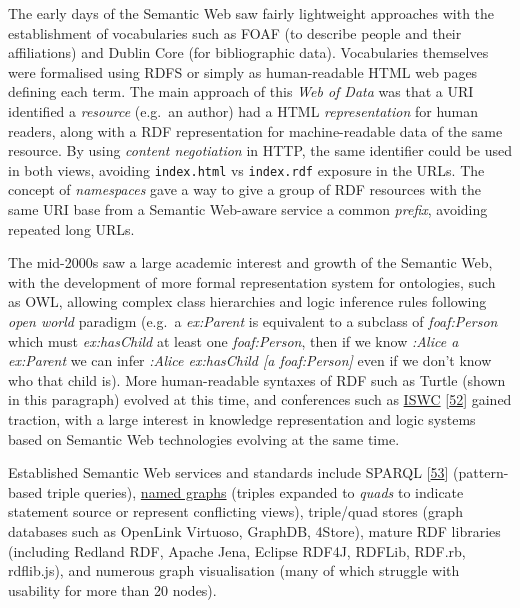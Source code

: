 The early days of the Semantic Web saw fairly lightweight approaches with the establishment of vocabularies such as FOAF (to describe people and their affiliations) and Dublin Core (for bibliographic data). Vocabularies themselves were formalised using RDFS or simply as human-readable HTML web pages defining each term. The main approach of this \emph{Web of Data} was that a URI identified a \emph{resource} (e.g.~an author) had a HTML \emph{representation} for human readers, along with a RDF representation for machine-readable data of the same resource. By using \emph{content negotiation} in HTTP, the same identifier could be used in both views, avoiding \texttt{index.html} vs \texttt{index.rdf} exposure in the URLs. The concept of \emph{namespaces} gave a way to give a group of RDF resources with the same URI base from a Semantic Web-aware service a common \emph{prefix}, avoiding repeated long URLs.

The mid-2000s saw a large academic interest and growth of the Semantic Web, with the development of more formal representation system for ontologies, such as OWL, allowing complex class hierarchies and logic inference rules following \emph{open world} paradigm (e.g.~a \emph{ex:Parent} is equivalent to a subclass of \emph{foaf:Person} which must \emph{ex:hasChild} at least one \emph{foaf:Person}, then if we know \emph{:Alice a ex:Parent} we can infer \emph{:Alice ex:hasChild {[}a foaf:Person{]}} even if we don't know who that child is). More human-readable syntaxes of RDF such as Turtle (shown in this paragraph) evolved at this time, and conferences such as \href{https://iswc2022.semanticweb.org/}{ISWC} {[}\protect\hyperlink{ref-yd2WE9eq}{52}{]} gained traction, with a large interest in knowledge representation and logic systems based on Semantic Web technologies evolving at the same time.

Established Semantic Web services and standards include SPARQL {[}\protect\hyperlink{ref-xww8fb1B}{53}{]} (pattern-based triple queries), \href{https://www.w3.org/TR/rdf11-concepts/\#section-dataset}{named graphs} (triples expanded to \emph{quads} to indicate statement source or represent conflicting views), triple/quad stores (graph databases such as OpenLink Virtuoso, GraphDB, 4Store), mature RDF libraries (including Redland RDF, Apache Jena, Eclipse RDF4J, RDFLib, RDF.rb, rdflib.js), and numerous graph visualisation (many of which struggle with usability for more than 20 nodes).

